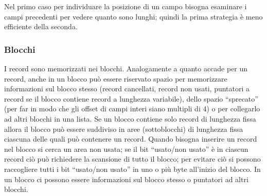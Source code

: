 Nel primo caso per individuare la posizione di un campo bisogna esaminare i campi precedenti per
vedere quanto sono lunghi; quindi la prima strategia è meno efficiente della seconda. 

\subsubsection{Blocchi}
I record sono memorizzati nei blocchi. Analogamente a quanto accade per un record, anche in un blocco 
può essere riservato spazio per memorizzare informazioni sul blocco stesso (record cancellati, record 
non usati, puntatori a record se il blocco contiene record a lunghezza variabile), dello spazio 
``sprecato'' (per far in modo che gli offset di campi interi siano multipli di 4) o per collegarlo ad altri 
blocchi in una lista. Se un blocco contiene solo record di lunghezza fissa allora il blocco può essere 
suddiviso in aree (sottoblocchi) di lunghezza fissa ciascuna delle quali può contenere un record. Quando 
bisogna inserire un record nel blocco si cerca un area non usata; se il bit ``usato/non usato'' è in ciascun record
ciò può richiedere la scansione di tutto il blocco; per evitare ciò si possono raccogliere tutti i bit
``usato/non usato'' in uno o più byte all'inizio del blocco. 
In un blocco ci possono essere informazioni sul blocco stesso o puntatori ad altri blocchi.\\

